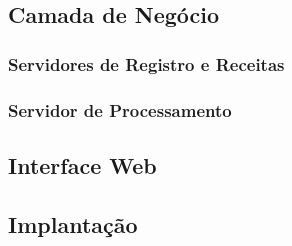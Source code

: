 \subsection{Camada de Negócio}


\subsubsection{Servidores de Registro e Receitas}


\subsubsection{Servidor de Processamento}


\subsection{Interface Web}

\subsection{Implantação}

